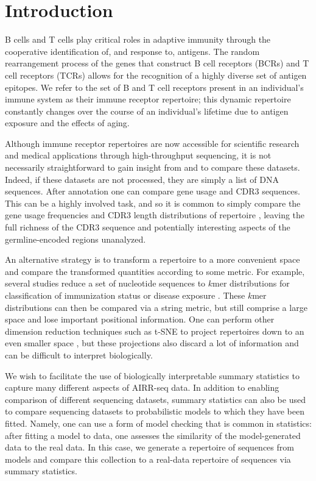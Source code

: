 \documentclass{article}
\begin{document}
\section*{Introduction}

B cells and T cells play critical roles in adaptive immunity through the cooperative identification of, and response to, antigens.
The random rearrangement process of the genes that construct B cell receptors (BCRs) and T cell receptors (TCRs) allows for the recognition of a highly diverse set of antigen epitopes.
We refer to the set of B and T cell receptors present in an individual's immune system as their immune receptor repertoire; this dynamic repertoire constantly changes over the course of an individual's lifetime due to antigen exposure and the effects of aging.

Although immune receptor repertoires are now accessible for scientific research and medical applications through high-throughput sequencing, it is not necessarily straightforward to gain insight from and to compare these datasets.
Indeed, if these datasets are not processed, they are simply a list of DNA sequences.
After annotation one can compare gene usage \cite{Hou2016-qc, Martin2015-ho, Corcoran2016-nw, Gadala2015-wq, Boyd2010-hd, Bolen2017-xt} and CDR3 sequences.
This can be a highly involved task, and so it is common to simply compare the gene usage frequencies and CDR3 length distributions of repertoire \cite{Miqueu2007-lk,Larimore2012-lo}, leaving the full richness of the CDR3 sequence and potentially interesting aspects of the germline-encoded regions unanalyzed.


An alternative strategy is to transform a repertoire to a more convenient space and compare the transformed quantities according to some metric.
For example, several studies reduce a set of nucleotide sequences to $k$mer distributions for classification of immunization status or disease exposure \cite{Madi2014-lt, Ostmeyer2017-xg, Heather2017pf}.
These $k$mer distributions can then be compared via a string metric, but still comprise a large space and lose important positional information.
One can perform other dimension reduction techniques such as t-SNE to project repertoires down to an even smaller space \cite{Yokota2017-zm}, but these projections also discard a lot of information and can be difficult to interpret biologically.

We wish to facilitate the use of biologically interpretable summary statistics to capture many different aspects of AIRR-seq data.
In addition to enabling comparison of different sequencing datasets, summary statistics can also be used to compare sequencing datasets to probabilistic models to which they have been fitted.
Namely, one can use a form of model checking that is common in statistics: after fitting a model to data, one assesses the similarity of the model-generated data to the real data.
In this case, we generate a repertoire of sequences from models and compare this collection to a real-data repertoire of sequences via summary statistics.
\end{document}
